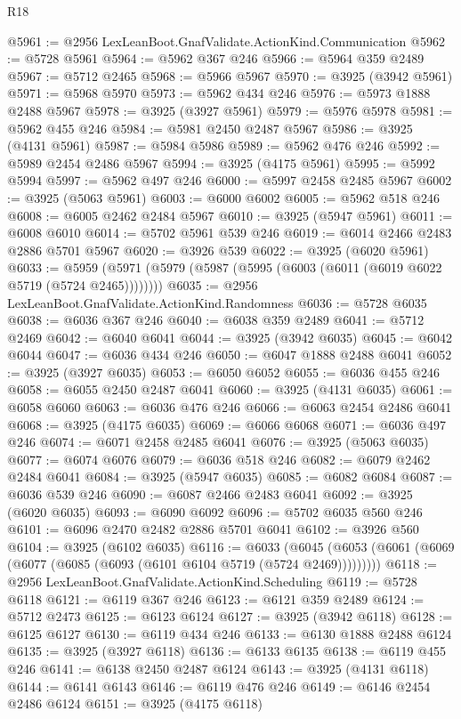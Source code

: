 \begin{lexlean}{R18}
\begin{coremodule}
{{{{{{{{{{{{{{{{{{{@5961 := @2956 LexLeanBoot.GnafValidate.ActionKind.Communication
@5962 := @5728 @5961
@5964 := @5962 @367 @246
@5966 := @5964 @359 @2489
@5967 := @5712 @2465
@5968 := @5966 @5967
@5970 := @3925 (@3942 @5961)
@5971 := @5968 @5970
@5973 := @5962 @434 @246
@5976 := @5973 @1888 @2488 @5967
@5978 := @3925 (@3927 @5961)
@5979 := @5976 @5978
@5981 := @5962 @455 @246
@5984 := @5981 @2450 @2487 @5967
@5986 := @3925 (@4131 @5961)
@5987 := @5984 @5986
@5989 := @5962 @476 @246
@5992 := @5989 @2454 @2486 @5967
@5994 := @3925 (@4175 @5961)
@5995 := @5992 @5994
@5997 := @5962 @497 @246
@6000 := @5997 @2458 @2485 @5967
@6002 := @3925 (@5063 @5961)
@6003 := @6000 @6002
@6005 := @5962 @518 @246
@6008 := @6005 @2462 @2484 @5967
@6010 := @3925 (@5947 @5961)
@6011 := @6008 @6010
@6014 := @5702 @5961 @539 @246
@6019 := @6014 @2466 @2483 @2886 @5701 @5967
@6020 := @3926 @539
@6022 := @3925 (@6020 @5961)
@6033 := @5959 (@5971 (@5979 (@5987 (@5995 (@6003 (@6011 (@6019 @6022 @5719 (@5724 @2465))))))))
@6035 := @2956 LexLeanBoot.GnafValidate.ActionKind.Randomness
@6036 := @5728 @6035
@6038 := @6036 @367 @246
@6040 := @6038 @359 @2489
@6041 := @5712 @2469
@6042 := @6040 @6041
@6044 := @3925 (@3942 @6035)
@6045 := @6042 @6044
@6047 := @6036 @434 @246
@6050 := @6047 @1888 @2488 @6041
@6052 := @3925 (@3927 @6035)
@6053 := @6050 @6052
@6055 := @6036 @455 @246
@6058 := @6055 @2450 @2487 @6041
@6060 := @3925 (@4131 @6035)
@6061 := @6058 @6060
@6063 := @6036 @476 @246
@6066 := @6063 @2454 @2486 @6041
@6068 := @3925 (@4175 @6035)
@6069 := @6066 @6068
@6071 := @6036 @497 @246
@6074 := @6071 @2458 @2485 @6041
@6076 := @3925 (@5063 @6035)
@6077 := @6074 @6076
@6079 := @6036 @518 @246
@6082 := @6079 @2462 @2484 @6041
@6084 := @3925 (@5947 @6035)
@6085 := @6082 @6084
@6087 := @6036 @539 @246
@6090 := @6087 @2466 @2483 @6041
@6092 := @3925 (@6020 @6035)
@6093 := @6090 @6092
@6096 := @5702 @6035 @560 @246
@6101 := @6096 @2470 @2482 @2886 @5701 @6041
@6102 := @3926 @560
@6104 := @3925 (@6102 @6035)
@6116 := @6033
    (@6045 (@6053 (@6061 (@6069 (@6077 (@6085 (@6093 (@6101 @6104 @5719 (@5724 @2469)))))))))
@6118 := @2956 LexLeanBoot.GnafValidate.ActionKind.Scheduling
@6119 := @5728 @6118
@6121 := @6119 @367 @246
@6123 := @6121 @359 @2489
@6124 := @5712 @2473
@6125 := @6123 @6124
@6127 := @3925 (@3942 @6118)
@6128 := @6125 @6127
@6130 := @6119 @434 @246
@6133 := @6130 @1888 @2488 @6124
@6135 := @3925 (@3927 @6118)
@6136 := @6133 @6135
@6138 := @6119 @455 @246
@6141 := @6138 @2450 @2487 @6124
@6143 := @3925 (@4131 @6118)
@6144 := @6141 @6143
@6146 := @6119 @476 @246
@6149 := @6146 @2454 @2486 @6124
@6151 := @3925 (@4175 @6118)
}}}}}}}}}}}}}}}}}}}
\end{coremodule}
\end{lexlean}
